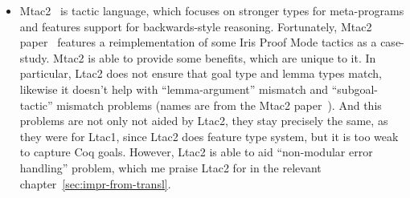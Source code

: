 \begin{itemize}
\item Mtac2~\cite{kaiserMtac2TypedTactics2018a} is tactic language, which focuses on stronger types for meta-programs and features support for backwards-style reasoning.
  Fortunately, Mtac2 paper~\cite{kaiserMtac2TypedTactics2018a} features a reimplementation of some Iris Proof Mode tactics as a case-study.
  Mtac2 is able to provide some benefits, which are unique to it.
  In particular, Ltac2 does not ensure that goal type and lemma types match, likewise it doesn't help with ``lemma-argument'' mismatch and ``subgoal-tactic'' mismatch problems (names are from the Mtac2 paper~\cite[Section~5.4]{kaiserMtac2TypedTactics2018a}).
  And this problems are not only not aided by Ltac2, they stay precisely the same, as they were for Ltac1, since Ltac2 does feature type system, but it is too weak to capture Coq goals.
  However, Ltac2 is able to aid ``non-modular error handling'' problem, which me praise Ltac2 for in the relevant chapter~\ref{sec:impr-from-transl}.


\end{itemize}
